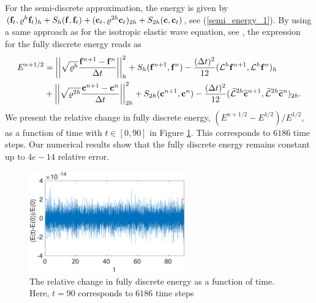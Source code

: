 For the semi-discrete approximation, the energy is given by $({\bf f}_t,\mathcal{\varrho}^h{\bf f}_t)_h + S_h({\bf f},{\bf f}_t) + ({\bf c}_t,\mathcal{\varrho}^{2h}{\bf c}_t)_{2h} + S_{2h}({\bf c},{\bf c}_t)$, see (\ref{semi_energy_1}). By using a same approach as for the isotropic elastic wave equation, see \cite{petersson2015wave,sjogreen2012fourth},  the expression for the fully discrete energy reads as
\begin{align*}
E^{n+1/2} &= \left|\left|\sqrt{\mathcal{\varrho}^h}\frac{{\bf f}^{n+1}-{\bf f}^n}{\Delta t}\right|\right|_h^2 + S_h({\bf f}^{n+1},{\bf f}^n) - \frac{(\Delta t)^2}{12}(\mathcal{L}^h{\bf f}^{n+1},\mathcal{L}^h{\bf f}^n)_h\\
&+ \left|\left|\sqrt{\mathcal{\varrho}^{2h}}\frac{{\bf c}^{n+1}-{\bf c}^n}{\Delta t}\right|\right|_{2h}^2 + S_{2h}({\bf c}^{n+1},{\bf c}^n) - \frac{(\Delta t)^2}{12}(\widetilde{\mathcal{L}}^{2h}\widetilde{\bf c}^{n+1},\widetilde{\mathcal{L}}^{2h}\widetilde{\bf c}^n)_{2h}.
\end{align*}
We present the relative change in fully discrete energy, $(E^{n+1/2}-E^{1/2})/E^{1/2}$, as a function of time with $t\in[0,90]$ in Figure \ref{discrete_energy}. This corresponds to $6186$ time steps. Our numerical results show that the fully discrete energy remains constant up to $4e-14$ relative error. 
\begin{figure}[htbp]
	\centering
	\includegraphics[width=0.6\textwidth,trim={0cm 0cm 0cm 0cm}, clip]{discrete_energy.eps}
	\caption{The relative change in fully discrete energy as a function of time. Here, $t = 90$ corresponds to $6186$ time steps}\label{discrete_energy}
\end{figure}


